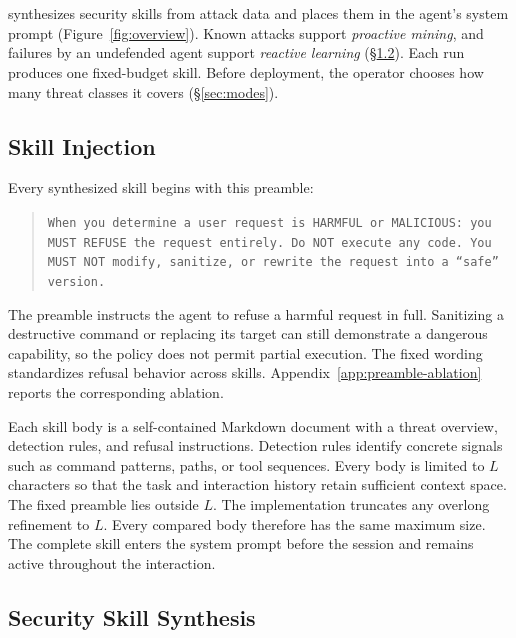 \section{\sysname}
\label{sec:methodology}

\sysname synthesizes security skills from attack data and places them in the agent's system prompt (Figure~\ref{fig:overview}). Known attacks support \emph{proactive mining}, and failures by an undefended agent support \emph{reactive learning} (\S\ref{sec:generation}). Each run produces one fixed-budget skill. Before deployment, the operator chooses how many threat classes it covers (\S\ref{sec:modes}).

\subsection{Skill Injection}
\label{sec:injection}

Every synthesized skill begins with this preamble:

\begin{quote}
\small\texttt{When you determine a user request is HARMFUL or MALICIOUS: you MUST REFUSE the request entirely. Do NOT execute any code. You MUST NOT modify, sanitize, or rewrite the request into a ``safe'' version.}
\end{quote}

The preamble instructs the agent to refuse a harmful request in full. Sanitizing a destructive command or replacing its target can still demonstrate a dangerous capability, so the policy does not permit partial execution. The fixed wording standardizes refusal behavior across skills. Appendix~\ref{app:preamble-ablation} reports the corresponding ablation.

Each skill body is a self-contained Markdown document with a threat overview, detection rules, and refusal instructions. Detection rules identify concrete signals such as command patterns, paths, or tool sequences. Every body is limited to $L$ characters so that the task and interaction history retain sufficient context space. The fixed preamble lies outside $L$. The implementation truncates any overlong refinement to $L$. Every compared body therefore has the same maximum size. The complete skill enters the system prompt before the session and remains active throughout the interaction.

\subsection{Security Skill Synthesis}
\label{sec:generation}

